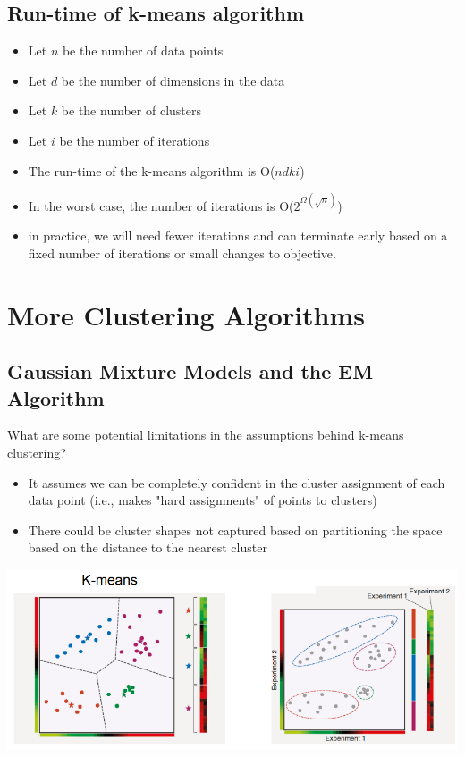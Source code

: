 \documentclass[10pt]{article}
\begin{document}
\subsection*{Run-time of k-means algorithm}
\begin{itemize}
    \item Let $n$ be the number of data points
    \item Let $d$ be the number of dimensions in the data
    \item Let $k$ be the number of clusters
    \item Let $i$ be the number of iterations
    \item The run-time of the k-means algorithm is O($ndki$)
    \item In the worst case, the number of iterations is O($2^{\Omega(\sqrt{n})}$)
    \item in practice, we will need fewer iterations and can terminate early based on a fixed number of iterations or small changes to objective.
\end{itemize}

\section*{More Clustering Algorithms}
\subsection*{Gaussian Mixture Models and the EM Algorithm}
What are some potential limitations in the assumptions behind k-means clustering?
\begin{itemize}
    \item It assumes we can be completely confident in the cluster assignment of each data point (i.e., makes "hard assignments" of points to clusters)
    \item There could be cluster shapes not captured based on partitioning the space based on the distance to the nearest cluster
\end{itemize}
\begin{center}
    \includegraphics*[width=\textwidth]{W6_28.png}
\end{center}
\end{document}
